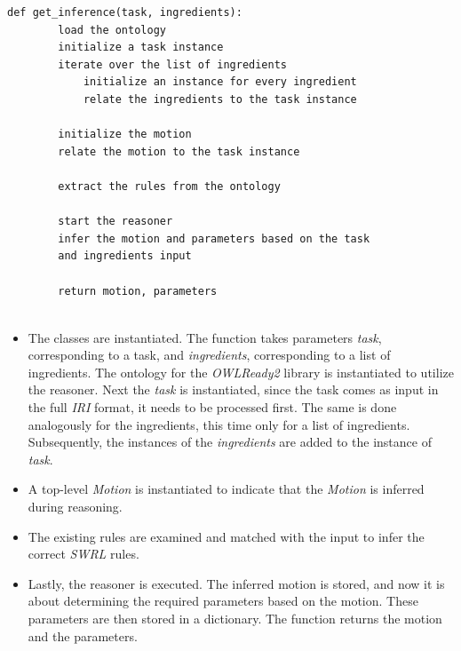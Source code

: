 \begin{lstlisting}[caption={Inference},captionpos=b]
    def get_inference(task, ingredients):
        load the ontology
        initialize a task instance
        iterate over the list of ingredients
            initialize an instance for every ingredient
            relate the ingredients to the task instance
        
        initialize the motion
        relate the motion to the task instance

        extract the rules from the ontology

        start the reasoner
        infer the motion and parameters based on the task 
        and ingredients input

        return motion, parameters


\end{lstlisting}
\begin{itemize}
    \item The classes are instantiated. The function takes parameters \textit{task}, corresponding to a task, and \textit{ingredients}, corresponding to a list of ingredients. The ontology for the \textit{OWLReady2} library is instantiated to utilize the reasoner. Next the \textit{task} is instantiated, since the task comes as input in the full \textit{IRI} format, it needs to be processed first. The same is done analogously for the ingredients, this time only for a list of ingredients. Subsequently, the instances of the \textit{ingredients} are added to the instance of \textit{task}.
    \item A top-level \textit{Motion} is instantiated to indicate that the \textit{Motion} is inferred during reasoning.
    \item The existing rules are examined and matched with the input to infer the correct \textit{SWRL} rules.
    \item Lastly, the reasoner is executed. The inferred motion is stored, and now it is about determining the required parameters based on the motion. These parameters are then stored in a dictionary. The function returns the motion and the parameters.
\end{itemize}

